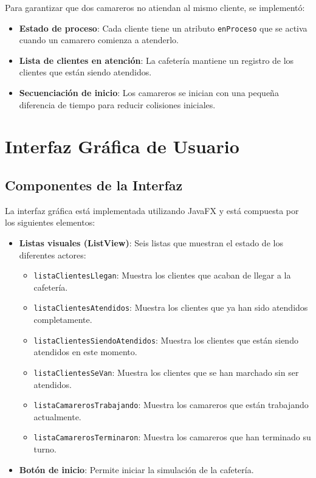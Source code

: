 \documentclass[a4paper,12pt]{article}
\begin{document}
Para garantizar que dos camareros no atiendan al mismo cliente, se implementó:

\begin{itemize}
    \item \textbf{Estado de proceso}: Cada cliente tiene un atributo \texttt{enProceso} que se activa cuando un camarero comienza a atenderlo.
    \item \textbf{Lista de clientes en atención}: La cafetería mantiene un registro de los clientes que están siendo atendidos.
    \item \textbf{Secuenciación de inicio}: Los camareros se inician con una pequeña diferencia de tiempo para reducir colisiones iniciales.
\end{itemize}

\section{Interfaz Gráfica de Usuario}

\subsection{Componentes de la Interfaz}

La interfaz gráfica está implementada utilizando JavaFX y está compuesta por los siguientes elementos:

\begin{itemize}
    \item \textbf{Listas visuales (ListView)}: Seis listas que muestran el estado de los diferentes actores:
    \begin{itemize}
        \item \texttt{listaClientesLlegan}: Muestra los clientes que acaban de llegar a la cafetería.
        \item \texttt{listaClientesAtendidos}: Muestra los clientes que ya han sido atendidos completamente.
        \item \texttt{listaClientesSiendoAtendidos}: Muestra los clientes que están siendo atendidos en este momento.
        \item \texttt{listaClientesSeVan}: Muestra los clientes que se han marchado sin ser atendidos.
        \item \texttt{listaCamarerosTrabajando}: Muestra los camareros que están trabajando actualmente.
        \item \texttt{listaCamarerosTerminaron}: Muestra los camareros que han terminado su turno.
    \end{itemize}
    \item \textbf{Botón de inicio}: Permite iniciar la simulación de la cafetería.
\end{itemize}
\end{document}
